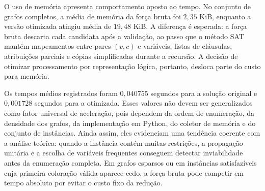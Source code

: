 O uso de memória apresenta comportamento oposto ao tempo. No conjunto de grafos completos, a média de memória da força bruta foi $2{,}35$ KiB, enquanto a versão otimizada atingiu média de $19{,}48$ KiB. A diferença é esperada: a força bruta descarta cada candidata após a validação, ao passo que o método SAT mantém mapeamentos entre pares $(v,c)$ e variáveis, listas de cláusulas, atribuições parciais e cópias simplificadas durante a recursão. A decisão de otimizar processamento por representação lógica, portanto, desloca parte do custo para memória.

Os tempos médios registrados foram $0{,}040755$ segundos para a solução original e $0{,}001728$ segundos para a otimizada. Esses valores não devem ser generalizados como fator universal de aceleração, pois dependem da ordem de enumeração, da densidade dos grafos, da implementação em Python, do coletor de memória e do conjunto de instâncias. Ainda assim, eles evidenciam uma tendência coerente com a análise teórica: quando a instância contém muitas restrições, a propagação unitária e a escolha de variáveis frequentes conseguem detectar inviabilidade antes da enumeração completa. Em grafos esparsos ou em instâncias satisfazíveis cuja primeira coloração válida aparece cedo, a força bruta pode competir em tempo absoluto por evitar o custo fixo da redução.
